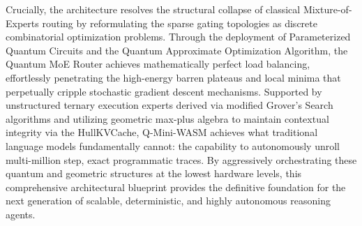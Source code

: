 \documentclass[11pt,a4paper]{article}
\begin{document}
Crucially, the architecture resolves the structural collapse of classical Mixture-of-Experts routing by reformulating the sparse gating topologies as discrete combinatorial optimization problems. Through the deployment of Parameterized Quantum Circuits and the Quantum Approximate Optimization Algorithm, the Quantum MoE Router achieves mathematically perfect load balancing, effortlessly penetrating the high-energy barren plateaus and local minima that perpetually cripple stochastic gradient descent mechanisms. Supported by unstructured ternary execution experts derived via modified Grover's Search algorithms and utilizing geometric max-plus algebra to maintain contextual integrity via the HullKVCache, Q-Mini-WASM achieves what traditional language models fundamentally cannot: the capability to autonomously unroll multi-million step, exact programmatic traces. By aggressively orchestrating these quantum and geometric structures at the lowest hardware levels, this comprehensive architectural blueprint provides the definitive foundation for the next generation of scalable, deterministic, and highly autonomous reasoning agents.
\end{document}
